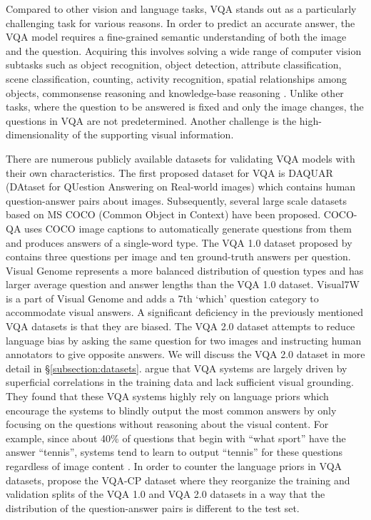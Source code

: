 \documentclass{article}
\begin{document}
Compared to other vision and language tasks, VQA stands out as a particularly challenging task for various reasons. In order to predict an accurate answer, the VQA model requires a fine-grained semantic understanding of both the image and the question. Acquiring this involves solving a wide range of computer vision subtasks such as object recognition, object detection, attribute classification, scene classification, counting, activity recognition, spatial relationships among objects, commonsense reasoning and knowledge-base reasoning \citep{manmadhan2020vqa}. Unlike other tasks, where the question to be answered is fixed and only the image changes, the questions in VQA are not predetermined. Another challenge is the high-dimensionality of the supporting visual information.

There are numerous publicly available datasets for validating VQA models with their own characteristics. The first proposed dataset for VQA is DAQUAR (DAtaset for QUestion Answering on Real-world images) \citep{malinowski2014vqa} which contains human question-answer pairs about images. Subsequently, several large scale datasets based on MS COCO (Common Object in Context) \citep{coco} have been proposed. COCO-QA \citet{ren2015exploring} uses COCO image captions to automatically generate questions from them and produces answers of a single-word type. The VQA 1.0 dataset proposed by \citet{antol2015vqa} contains three questions per image and ten ground-truth answers per question. Visual Genome \citep{krishnavisualgenome} represents a more balanced distribution of question types and has larger average question and answer lengths than the VQA 1.0 dataset. Visual7W \citep{zhu2016cvpr} is a part of Visual Genome and adds a 7th `which' question category to accommodate visual answers. A significant deficiency in the previously mentioned VQA datasets is that they are biased. The VQA 2.0 dataset \citep{goyal2017vqa2} attempts to reduce language bias by asking the same question for two images and instructing human annotators to give opposite answers. We will discuss the VQA 2.0 dataset in more detail in \S \ref{subsection:datasets}.
\citet{agrawal12018gvqa} argue that VQA systems are largely driven by superficial correlations in the training data and lack sufficient visual grounding. They found that these VQA systems highly rely on language priors which encourage the systems to blindly output the most common answers by only focusing on the questions without reasoning about the visual content. For example, since about 40\% of questions that begin with ``what sport'' have the answer ``tennis'', systems tend to learn to output ``tennis'' for these questions regardless of image content \citep{wu2019self}. In order to counter the language priors in VQA datasets, \citet{agrawal12018gvqa} propose the VQA-CP dataset where they reorganize the training and validation splits of the VQA 1.0 and VQA 2.0 datasets in a way that the distribution of the question-answer pairs is different to the test set.
\end{document}
